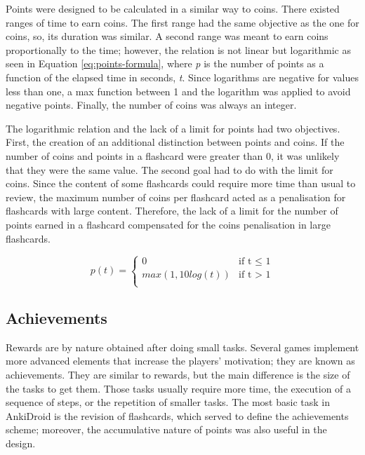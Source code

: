 Points were designed to be calculated in a similar way to coins. There existed ranges of time to earn coins. The first range had the same objective as the one for coins, so, its duration was similar. A second range was meant to earn coins proportionally to the time; however, the relation is not linear but logarithmic as seen in Equation \ref{eq:points-formula}, where \textit{p} is the number of points as a function of the elapsed time in seconds, \textit{t}. Since logarithms are negative for values less than one, a max function between 1 and the logarithm was applied to avoid negative points. Finally, the number of coins was always an integer.

The logarithmic relation and the lack of a limit for points had two objectives. First, the creation of an additional distinction between points and coins. If the number of coins and points in a flashcard were greater than 0, it was unlikely that they were the same value. The second goal had to do with the limit for coins. Since the content of some flashcards could require more time than usual to review, the maximum number of coins per flashcard acted as a penalisation for flashcards with large content. Therefore, the lack of a limit for the number of points earned in a flashcard compensated for the coins penalisation in large flashcards.

\begin{equation}
  p(t) =
      \begin{cases}
        0 & \text{if t $\leq$ 1}\\
        max(1, 10log(t)) & \text{if t $>$ 1}\\
      \end{cases}
    \label{eq:points-formula}
\end{equation}

\subsection{Achievements}
Rewards are by nature obtained after doing small tasks. Several games implement more advanced elements that increase the players' motivation; they are known as achievements. They are similar to rewards, but the main difference is the size of the tasks to get them. Those tasks usually require more time, the execution of a sequence of steps, or the repetition of smaller tasks. The most basic task in AnkiDroid is the revision of flashcards, which served to define the achievements scheme; moreover, the accumulative nature of points was also useful in the design.

